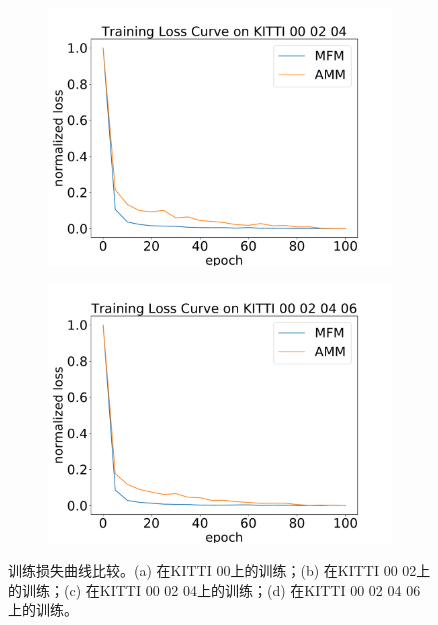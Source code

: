 {\begin{figure}[ht]
\begin{subfigure}[b]{0.45\textwidth}
        \caption{}
        \label{fig:tl_02}
        \vspace{4pt}
    \end{subfigure}
    \begin{subfigure}[b]{0.45\textwidth}
        \includegraphics[width=\textwidth]{datavo/training_loss_0-4.pdf}
        \caption{}
        \label{fig:tl_024}
    \end{subfigure}
    \begin{subfigure}[b]{0.45\textwidth}
        \includegraphics[width=\textwidth]{datavo/training_loss_0-6.pdf}
        \caption{}
        \label{fig:tl_0246}
    \end{subfigure}
\caption{训练损失曲线比较。(a) 在KITTI 00上的训练；(b) 在KITTI 00 02上的训练；(c) 在KITTI 00 02 04上的训练；(d) 在KITTI 00 02 04 06上的训练。}    

\end{figure}}
